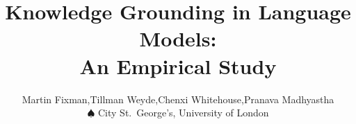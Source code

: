 \documentclass{article}
\title{Knowledge Grounding in Language Models: \\ An Empirical Study}
\author{%
	Martin Fixman\spade{},Tillman Weyde\spade{},Chenxi Whitehouse\spade{},Pranava Madhyastha\spade{} \\
	$\spadesuit{}$ City St.\ George's, University of London%
}
\begin{document}
\maketitle{}

\begin{abstract}
	
\end{abstract}












\end{document}

